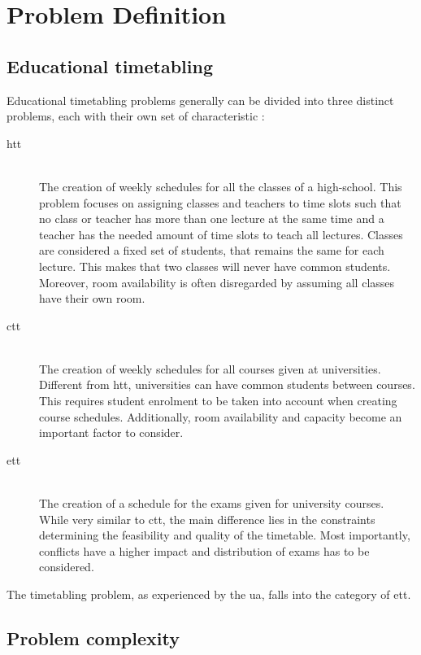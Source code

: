 
\section{Problem Definition}\label{sec:problem}

\subsection{Educational timetabling}
Educational timetabling problems generally can be divided into three distinct problems, each with their own set of characteristic \cite{schaerf1996, kingston2013}:

\begin{description}
   \item [\acrfull{htt}] \hfill \\ The creation of weekly schedules for all the classes of a high-school. This problem focuses on assigning classes and teachers to time slots such that no class or teacher has more than one lecture at the same time and a teacher has the needed amount of time slots to teach all lectures. Classes are considered a fixed set of students, that remains the same for each lecture. This makes that two classes will never have common students. Moreover, room availability is often disregarded by assuming all classes have their own room.
   \item [\acrfull{ctt}] \hfill \\ The creation of weekly schedules for all courses given at universities. Different from \acrshort{htt}, universities can have common students between courses. This requires student enrolment to be taken into account when creating course schedules. Additionally, room availability and capacity become an important factor to consider.
   \item [\acrfull{ett}] \hfill \\ The creation of a schedule for the exams given for university courses. While very similar to \acrshort{ctt}, the main difference lies in the constraints determining the feasibility and quality of the timetable. Most importantly, conflicts have a higher impact and distribution of exams has to be considered.
\end{description}

The timetabling problem, as experienced by the \acrfull{ua}, falls into the category of \acrshort{ett}. 

\subsection{Problem complexity}

